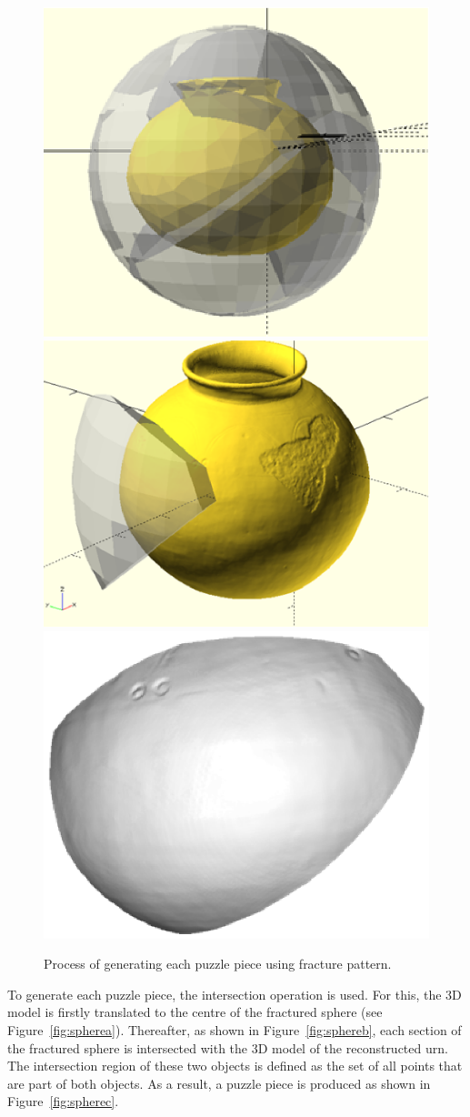 \documentclass[acmlarge,screen,dvipsnames]{acmart}
\begin{document}
\begin{figure}[h]
  \centering
  {\includegraphics[width=0.30\linewidth]{images/sphere}}
  \hspace{0.2in}
   {\includegraphics[width=0.30\linewidth]{images/intersection}}
   \hspace{0.2in}
  {\includegraphics[width=0.30\linewidth]{images/puzzlepiece}}
    
    
    \caption{Process of generating each puzzle piece using fracture pattern.}
\end{figure}

%



To generate each puzzle piece, the intersection operation is used. For
this, the 3D model is firstly translated to the centre of the fractured
sphere (see Figure~\ref{fig:spherea}). Thereafter, as shown in
Figure~\ref{fig:sphereb}, each section of the fractured sphere
is intersected with the 3D model of the reconstructed urn. The
intersection region of these two objects is defined as the set of all
points that are part of both objects. As a result, a puzzle piece is
produced as shown in Figure~\ref{fig:spherec}.
%
\end{document}

